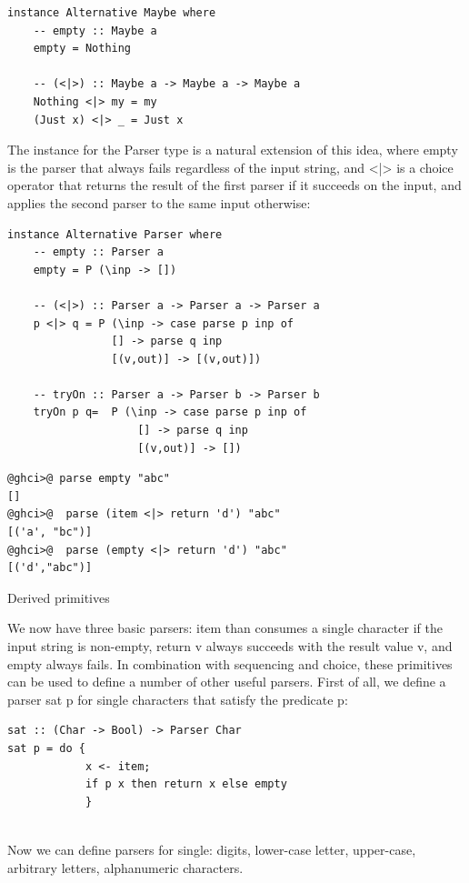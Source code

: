 \documentclass[a4papert]{article}
\begin{document}
\begin{lstlisting}[style=haskellstyle]
instance Alternative Maybe where
    -- empty :: Maybe a
    empty = Nothing

    -- (<|>) :: Maybe a -> Maybe a -> Maybe a
    Nothing <|> my = my
    (Just x) <|> _ = Just x
\end{lstlisting}


The instance for the Parser type is a natural extension of this idea, where empty is the parser that always fails regardless of the input string, and <|> is a choice operator that returns the result of the first parser if it succeeds on the input, and applies the second parser to the same input otherwise:

\begin{lstlisting}[style=haskellstyle]
instance Alternative Parser where
    -- empty :: Parser a
    empty = P (\inp -> [])

    -- (<|>) :: Parser a -> Parser a -> Parser a
    p <|> q = P (\inp -> case parse p inp of
                [] -> parse q inp
                [(v,out)] -> [(v,out)])

    -- tryOn :: Parser a -> Parser b -> Parser b
    tryOn p q=  P (\inp -> case parse p inp of
                    [] -> parse q inp
                    [(v,out)] -> [])

\end{lstlisting}
\begin{lstlisting}[style=ghcistyle]
@ghci>@ parse empty "abc"
[]
@ghci>@  parse (item <|> return 'd') "abc"
[('a', "bc")]
@ghci>@  parse (empty <|> return 'd') "abc"
[('d',"abc")]
\end{lstlisting}


Derived primitives

We now have three basic parsers: item than consumes a single character if the input string is non-empty, return v always succeeds with the result value v, and empty always fails. In combination with sequencing and choice, these primitives can be used to define a number of other useful parsers. First of all, we define a parser sat p for single characters that satisfy the predicate p:

\begin{lstlisting}[style=haskellstyle]
sat :: (Char -> Bool) -> Parser Char
sat p = do {
            x <- item;
            if p x then return x else empty
            }


\end{lstlisting}
Now we can define parsers for single: digits, lower-case letter, upper-case, arbitrary letters, alphanumeric characters.
\end{document}
